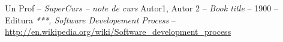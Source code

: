 \clearpage
{}

\begin{thebibliography}{99}
		{Un Prof -- \emph{SuperCurs -- note de curs}}
		{Autor1, Autor 2  --
			\emph{Book title} -- 1900 -- Editura}
		{\emph{***, Software Developement Process} --\\
			\href{http://en.wikipedia.org/wiki/Software_development_process}
				{http://en.wikipedia.org/wiki/Software\_development\_process}
		}
\end{thebibliography}
